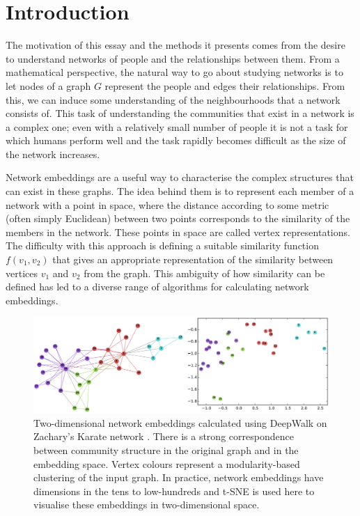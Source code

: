 \documentclass[a4paper]{article}
\begin{document}


\tableofcontents

\section{Introduction}
The motivation of this essay and the methods it presents comes from the desire to understand networks of people and the relationships between them.
From a mathematical perspective, the natural way to go about studying networks is to let nodes of a graph $G$ represent the people and edges their relationships.
From this, we can induce some understanding of the neighbourhoods that a network consists of. This task of understanding the communities that exist in a network is a complex one; 
even with a relatively small number of people it is not a task for which humans perform well and the task rapidly becomes difficult as the size of the network increases.\par
Network embeddings are a useful way to characterise the complex structures that
can exist in these graphs. The idea behind them is to represent each member of a
network with a point in space, where the distance according to some metric
(often simply Euclidean) between two points corresponds to the similarity of
the members in the network. These points in space are called vertex
representations. The difficulty with this approach is defining a suitable
similarity function $f(v_1,v_2)$ that gives an appropriate representation of the similarity between vertices $v_1$ and $v_2$ from the graph. This ambiguity of how similarity can be defined has led to a diverse range of algorithms for calculating network embeddings.

\begin{figure}[h!]
  \centering
  \includegraphics[width = 1\textwidth]{src/DeepWalkOnKarateGraph.png}

  \caption{Two-dimensional network embeddings calculated using
    DeepWalk \cite{deepwalk} on Zachary's Karate network \cite{zachary1977}. There is a strong
    correspondence between community structure in the original graph and
    in the embedding space. Vertex colours represent a modularity-based
    clustering of the input graph. In practice, network embeddings have dimensions
    in the tens to low-hundreds and t-SNE \cite{maaten2008} is used here to visualise these embeddings in two-dimensional
    space.}
\end{figure}
\end{document}
